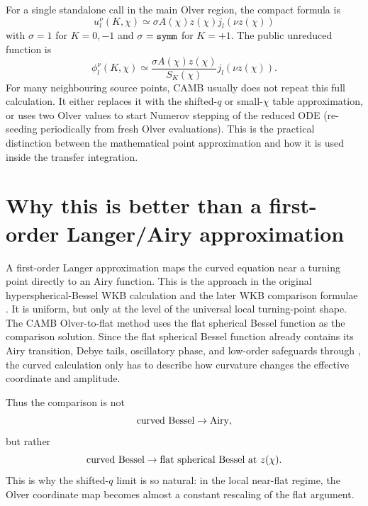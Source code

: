 \documentclass[11pt,a4paper]{article}
\newcommand{\code}[1]{\texttt{\detokenize{#1}}}
\newcommand{\SK}{S_K}
\begin{document}
For a single standalone call in the main Olver region, the compact formula is
\begin{equation}
  \boxed{
  u_l^\nu(K,\chi)\simeq \sigma A(\chi)z(\chi)j_l(\nu z(\chi))
  }
\end{equation}
with \(\sigma=1\) for \(K=0,-1\) and \(\sigma=\code{symm}\) for \(K=+1\).  The public unreduced function is
\begin{equation}
  \boxed{
  \phi_l^\nu(K,\chi)\simeq
  \frac{\sigma A(\chi)z(\chi)}{\SK(\chi)}j_l(\nu z(\chi)).
  }
\end{equation}
For many neighbouring source points, CAMB usually does not repeat this full calculation.  It either replaces it with the shifted-\(q\) or small-\(\chi\) table approximation, or uses two Olver values to start Numerov stepping of the reduced ODE (re-seeding periodically from fresh Olver evaluations).  This is the practical distinction between the mathematical point approximation and how it is used inside the transfer integration.

\section{Why this is better than a first-order Langer/Airy approximation}

A first-order Langer approximation maps the curved equation near a turning point directly to an Airy function.  This is the approach in the original hyperspherical-Bessel WKB calculation and the later WKB comparison formulae \cite{kosowsky1998,tram2013,lesgourgues-tram2013}.  It is uniform, but only at the level of the universal local turning-point shape.  The CAMB Olver-to-flat method uses the flat spherical Bessel function as the comparison solution.  Since the flat spherical Bessel function already contains its Airy transition, Debye tails, oscillatory phase, and low-order safeguards through \code{BJL}, the curved calculation only has to describe how curvature changes the effective coordinate and amplitude.

Thus the comparison is not
\begin{equation}
  \hbox{curved Bessel}\to\hbox{Airy},
\end{equation}
but rather
\begin{equation}
  \hbox{curved Bessel}\to\hbox{flat spherical Bessel at }z(\chi).
\end{equation}
This is why the shifted-\(q\) limit is so natural: in the local near-flat regime, the Olver coordinate map becomes almost a constant rescaling of the flat argument.
\end{document}
